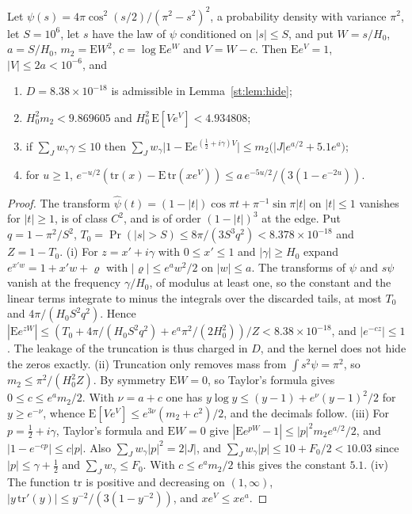 \begin{lemma}\label{st:lem:cosine}
Let $\psi(s)=4\pi\cos^2(s/2)/(\pi^2-s^2)^2$, a probability density with variance $\pi^2$, let $S=10^6$, let $s$ have the law of $\psi$ conditioned on $|s|\le S$, and put $W=s/H_0$, $a=S/H_0$, $m_2=\mathrm EW^2$, $c=\log\mathrm Ee^W$ and $V=W-c$. Then $\mathrm Ee^V=1$, $|V|\le2a<10^{-6}$, and
\begin{enumerate}
\item[(i)] $D=8.38\times10^{-18}$ is admissible in Lemma~\ref{st:lem:hide};
\item[(ii)] $H_0^2m_2<9.869605$ and $H_0^2\,\mathrm E[Ve^V]<4.934808$;
\item[(iii)] if $\sum_Jw_\gamma\gamma\le10$ then $\sum_Jw_\gamma\big|1-\mathrm Ee^{(\frac12+i\gamma)V}\big|\le m_2\big(|J|e^{a/2}+5.1e^a\big)$;
\item[(iv)] for $u\ge1$, $e^{-u/2}(\mathrm{tr}(x)-\mathrm E\,\mathrm{tr}(xe^V))\le a\,e^{-5u/2}/(3(1-e^{-2u}))$.
\end{enumerate}
\end{lemma}
\begin{proof}
The transform $\hat\psi(t)=(1-|t|)\cos\pi t+\pi^{-1}\sin\pi|t|$ on $|t|\le1$ vanishes for $|t|\ge1$, is of class $C^2$, and is of order $(1-|t|)^3$ at the edge. Put $q=1-\pi^2/S^2$, $T_0=\Pr(|s|>S)\le8\pi/(3S^3q^2)<8.378\times10^{-18}$ and $Z=1-T_0$. (i) For $z=x'+i\gamma$ with $0\le x'\le1$ and $|\gamma|\ge H_0$ expand $e^{x'w}=1+x'w+\varrho$ with $|\varrho|\le e^aw^2/2$ on $|w|\le a$. The transforms of $\psi$ and $s\psi$ vanish at the frequency $\gamma/H_0$, of modulus at least one, so the constant and the linear terms integrate to minus the integrals over the discarded tails, at most $T_0$ and $4\pi/(H_0S^2q^2)$. Hence $|\mathrm Ee^{zW}|\le(T_0+4\pi/(H_0S^2q^2)+e^a\pi^2/(2H_0^2))/Z<8.38\times10^{-18}$, and $|e^{-cz}|\le1$. The leakage of the truncation is thus charged in $D$, and the kernel does not hide the zeros exactly. (ii) Truncation only removes mass from $\int s^2\psi=\pi^2$, so $m_2\le\pi^2/(H_0^2Z)$. By symmetry $\mathrm EW=0$, so Taylor's formula gives $0\le c\le e^am_2/2$. With $\nu=a+c$ one has $y\log y\le(y-1)+e^\nu(y-1)^2/2$ for $y\ge e^{-\nu}$, whence $\mathrm E[Ve^V]\le e^{3\nu}(m_2+c^2)/2$, and the decimals follow. (iii) For $p=\tfrac12+i\gamma$, Taylor's formula and $\mathrm EW=0$ give $|\mathrm Ee^{pW}-1|\le|p|^2m_2e^{a/2}/2$, and $|1-e^{-cp}|\le c|p|$. Also $\sum_Jw_\gamma|p|^2=2|J|$, and $\sum_Jw_\gamma|p|\le10+F_0/2<10.03$ since $|p|\le\gamma+\tfrac12$ and $\sum_Jw_\gamma\le F_0$. With $c\le e^am_2/2$ this gives the constant $5.1$. (iv) The function $\mathrm{tr}$ is positive and decreasing on $(1,\infty)$, $|y\,\mathrm{tr}'(y)|\le y^{-2}/(3(1-y^{-2}))$, and $xe^V\le xe^a$.
\end{proof}
